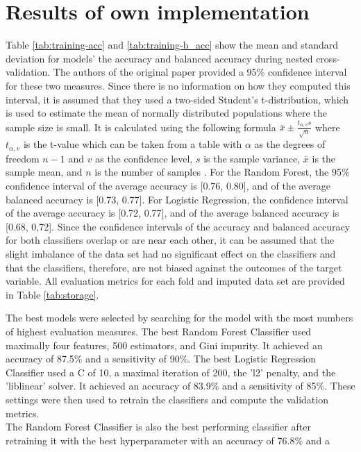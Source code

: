 \section{Results of own implementation}
Table \ref{tab:training-acc} and \ref{tab:training-b_acc} show the mean and 
standard deviation for models' the accuracy and balanced accuracy during 
nested cross-validation. The authors of the original paper provided a 95\% 
confidence interval for these two measures. Since there is no information on 
how they computed this interval, it is assumed that they used a two-sided 
Student's t-distribution, which is used to estimate the mean of normally 
distributed populations where the sample size is small. It is calculated using 
the following formula $\bar{x} \pm \frac{t_{\alpha, v}s}{\sqrt{n}}$ where 
$t_{\alpha, v}$ is the t-value which can be taken from a table with $\alpha$ 
as the degrees of freedom $n-1$ and $v$ as the confidence level, $s$ is the 
sample variance, $\bar{x}$ is the sample mean, and $n$ is the number of samples 
\cite{RN197}.
For the Random Forest, the 95\% confidence interval of the average accuracy is 
[0.76, 0.80], and of the average balanced accuracy is [0.73, 0.77]. For 
Logistic Regression, the confidence interval of the average accuracy is [0.72, 
0.77], and of the average balanced accuracy is [0.68, 0,72]. Since the 
confidence intervals of the accuracy and balanced accuracy for both classifiers 
overlap or are near each other, it can be assumed that the slight imbalance of 
the data set had no significant effect on the classifiers and that the 
classifiers, therefore, are not biased against the outcomes of the target 
variable. All evaluation metrics for each fold and imputed data set are 
provided in Table \ref{tab:storage}.
\par
The best models were selected by searching for the model with the most numbers 
of highest evaluation measures. The best Random Forest Classifier used 
maximally 
four features, 500 estimators, and Gini impurity. It achieved an accuracy of 
87.5\% and a 
sensitivity of 90\%. The best Logistic Regression Classifier used a C of 10, a 
maximal iteration of 200, the 'l2' penalty, and the 'liblinear' solver. It 
achieved an accuracy 
of 83.9\% and a sensitivity of 85\%. These settings were then used to retrain 
the classifiers and compute the validation metrics.
\\
The Random Forest Classifier is also the best performing classifier after 
retraining it with the best hyperparameter with an accuracy of 76.8\% and a 
